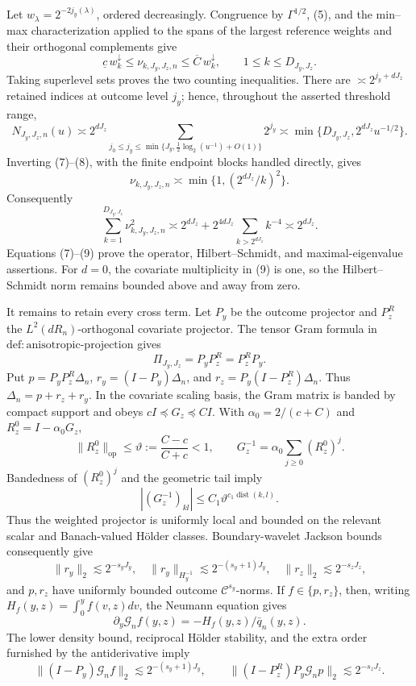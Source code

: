 Let \(w_\lambda=2^{-2j_y(\lambda)}\), ordered decreasingly.  Congruence by \(\Gamma^{1/2}\), (5), and the min--max characterization applied to the spans of the largest reference weights and their orthogonal complements give
\[
\underline c\,w_k^\downarrow\le\nu_{k,J_y,J_z,n}
\le\overline C\,w_k^\downarrow,
\qquad1\le k\le D_{J_y,J_z}. \tag{7}
\]
Taking superlevel sets proves the two counting inequalities.  There are \(\asymp2^{j_y+dJ_z}\) retained indices at outcome level \(j_y\); hence, throughout the asserted threshold range,
\[
N_{J_y,J_z,n}(u)
\asymp2^{dJ_z}\!\sum_{j_0\le j_y\le
\min\{J_y,\frac12\log_2(u^{-1})+O(1)\}}2^{j_y}
\asymp\min\{D_{J_y,J_z},2^{dJ_z}u^{-1/2}\}. \tag{8}
\]
Inverting (7)--(8), with the finite endpoint blocks handled directly, gives
\[
\nu_{k,J_y,J_z,n}\asymp\min\{1,(2^{dJ_z}/k)^2\}.
\]
Consequently
\[
\sum_{k=1}^{D_{J_y,J_z}}\nu_{k,J_y,J_z,n}^2
\asymp2^{dJ_z}+2^{4dJ_z}\sum_{k>2^{dJ_z}}k^{-4}
\asymp2^{dJ_z}. \tag{9}
\]
Equations (7)--(9) prove the operator, Hilbert--Schmidt, and maximal-eigenvalue assertions.  For \(d=0\), the covariate multiplicity in (9) is one, so the Hilbert--Schmidt norm remains bounded above and away from zero.

It remains to retain every cross term.  Let \(P_y\) be the outcome projector and \(P_z^R\) the \(L^2(dR_n)\)-orthogonal covariate projector.  The tensor Gram formula in \(\mathrm{def{:}anisotropic\text{-}projection}\) gives
\[
\Pi_{J_y,J_z}=P_yP_z^R=P_z^RP_y. \tag{10}
\]
Put \(p=P_yP_z^R\Delta_n\), \(r_y=(I-P_y)\Delta_n\), and \(r_z=P_y(I-P_z^R)\Delta_n\).  Thus \(\Delta_n=p+r_z+r_y\).  In the covariate scaling basis, the Gram matrix is banded by compact support and obeys \(cI\preceq G_z\preceq CI\).  With \(\alpha_0=2/(c+C)\) and \(R_z^0=I-\alpha_0G_z\),
\[
\|R_z^0\|_{\mathrm{op}}\le\vartheta:=\frac{C-c}{C+c}<1,
\qquad G_z^{-1}=\alpha_0\sum_{j\ge0}(R_z^0)^j.
\]
Bandedness of \((R_z^0)^j\) and the geometric tail imply
\[
|(G_z^{-1})_{kl}|\le C_1\vartheta^{c_1\operatorname{dist}(k,l)}. \tag{11}
\]
Thus the weighted projector is uniformly local and bounded on the relevant scalar and Banach-valued H\"older classes.  Boundary-wavelet Jackson bounds consequently give
\[
\|r_y\|_2\lesssim2^{-s_yJ_y},\quad
\|r_y\|_{H_y^{-1}}\lesssim2^{-(s_y+1)J_y},\quad
\|r_z\|_2\lesssim2^{-s_zJ_z}, \tag{12}
\]
and \(p,r_z\) have uniformly bounded outcome \(\mathcal C^{s_y}\)-norms.  If \(f\in\{p,r_z\}\), then, writing \(H_f(y,z)=\int_0^yf(v,z)dv\), the Neumann equation gives
\[
\partial_y\mathcal G_nf(y,z)=-H_f(y,z)/\bar q_n(y,z). \tag{13}
\]
The lower density bound, reciprocal H\"older stability, and the extra order furnished by the antiderivative imply
\[
\|(I-P_y)\mathcal G_nf\|_2\lesssim2^{-(s_y+1)J_y},
\qquad
\|(I-P_z^R)P_y\mathcal G_np\|_2\lesssim2^{-s_zJ_z}. \tag{14}
\]

